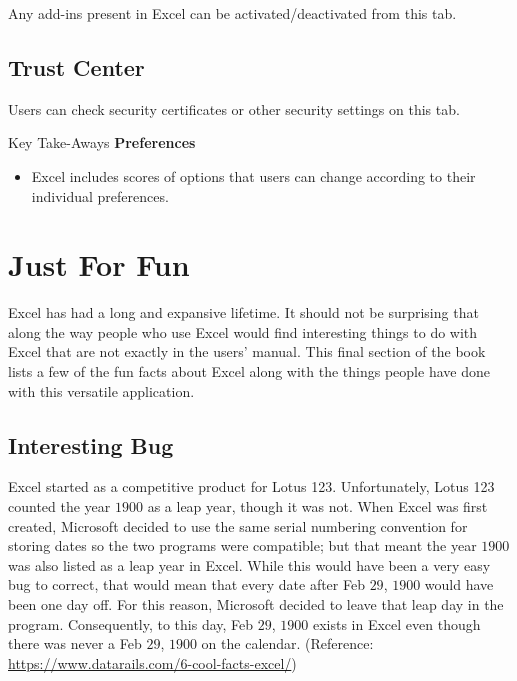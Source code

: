 Any add-ins present in Excel can be activated/deactivated from this tab.

\subsection{Trust Center}

Users can check security certificates or other security settings on this tab.

\begin{center}
	\begin{tkwbox}{Key Take-Aways}
		\textbf{Preferences}
		\\
		\begin{itemize}
			\setlength{\itemsep}{0pt}
			\setlength{\parskip}{0pt}
			\setlength{\parsep}{0pt}
			
			\item Excel includes scores of options that users can change according to their individual preferences.
			
		\end{itemize}
	\end{tkwbox}
\end{center}

\section{Just For Fun}

Excel has had a long and expansive lifetime. It should not be surprising that along the way people who use Excel would find interesting things to do with Excel that are not exactly in the users' manual. This final section of the book lists a few of the fun facts about Excel along with the things people have done with this versatile application.

\subsection{Interesting Bug}

Excel started as a competitive product for Lotus 123. Unfortunately, Lotus 123 counted the year $ 1900 $ as a leap year, though it was not. When Excel was first created, Microsoft decided to use the same serial numbering convention for storing dates so the two programs were compatible; but that meant the year $ 1900 $ was also listed as a leap year in Excel. While this would have been a very easy bug to correct, that would mean that every date after Feb $ 29 $, $ 1900 $ would have been one day off. For this reason, Microsoft decided to leave that leap day in the program. Consequently, to this day, Feb $ 29 $, $ 1900 $ exists in Excel even though there was never a Feb $ 29 $, $ 1900 $ on the calendar. (Reference: \url{https://www.datarails.com/6-cool-facts-excel/})

